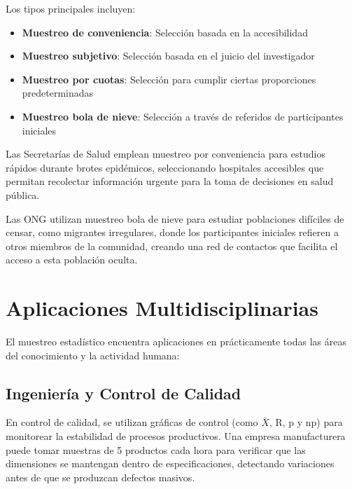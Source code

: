 Los tipos principales incluyen:

\begin{itemize}
\item \textbf{Muestreo de conveniencia}: Selección basada en la accesibilidad
\item \textbf{Muestreo subjetivo}: Selección basada en el juicio del investigador
\item \textbf{Muestreo por cuotas}: Selección para cumplir ciertas proporciones predeterminadas
\item \textbf{Muestreo bola de nieve}: Selección a través de referidos de participantes iniciales
\end{itemize}

\begin{example}
Las Secretarías de Salud emplean muestreo por conveniencia para estudios rápidos durante brotes epidémicos, seleccionando hospitales accesibles que permitan recolectar información urgente para la toma de decisiones en salud pública.
\end{example}

\begin{example}
Las ONG utilizan muestreo bola de nieve para estudiar poblaciones difíciles de censar, como migrantes irregulares, donde los participantes iniciales refieren a otros miembros de la comunidad, creando una red de contactos que facilita el acceso a esta población oculta.
\end{example}

\section{Aplicaciones Multidisciplinarias}

El muestreo estadístico encuentra aplicaciones en prácticamente todas las áreas del conocimiento y la actividad humana:

\subsection{Ingeniería y Control de Calidad}

\begin{example}
En control de calidad, se utilizan gráficas de control (como $\bar{X}$, R, p y np) para monitorear la estabilidad de procesos productivos. Una empresa manufacturera puede tomar muestras de 5 productos cada hora para verificar que las dimensiones se mantengan dentro de especificaciones, detectando variaciones antes de que se produzcan defectos masivos.
\end{example}


